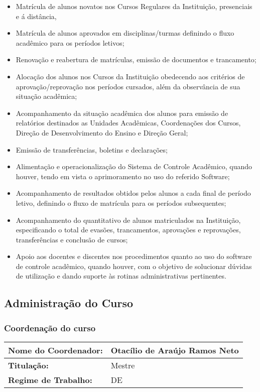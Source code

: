 \begin{itemize}
	\item Matrícula de alunos novatos nos Cursos Regulares da Instituição, presenciais e á distância, 
	\item Matrícula de alunos aprovados em disciplinas/turmas definindo o fluxo acadêmico para os períodos letivos;
	\item Renovação e reabertura de matrículas, emissão de documentos e  trancamento; 
	\item Alocação dos alunos nos Cursos da Instituição obedecendo aos critérios de aprovação/reprovação nos períodos cursados, além da observância de sua situação acadêmica;
	\item Acompanhamento da situação acadêmica dos alunos para emissão de relatórios destinados as Unidades Acadêmicas, Coordenações dos Cursos, Direção de Desenvolvimento do Ensino e Direção Geral;
	\item Emissão de transferências, boletins e declarações;

	\item Alimentação e operacionalização do Sistema de Controle Acadêmico, quando houver, tendo em vista o aprimoramento no uso do referido Software;
	\item Acompanhamento de resultados obtidos pelos alunos a cada final de período letivo, definindo o fluxo de matrícula para os períodos subsequentes; 

	\item Acompanhamento do quantitativo de alunos matriculados na Instituição, especificando o total de evasões, trancamentos, aprovações e reprovações, transferências e conclusão de cursos;
	\item Apoio aos docentes e discentes nos procedimentos quanto ao uso do software de controle acadêmico, quando houver, com o objetivo de solucionar dúvidas de utilização e dando suporte às rotinas administrativas pertinentes.
\end{itemize}


\subsection{Administra\c{c}\~ao do Curso}

\subsubsection{Coordena\c{c}\~ao do curso}

\begin{table}[h]
\begin{tabular}{|l|l|}
\hline
\textbf{Nome do Coordenador:} & Otac\'ilio de Ara\'ujo Ramos Neto \\ \hline
\textbf{Titulação:}           & Mestre                             \\ \hline
\textbf{Regime de Trabalho:}  & DE                                 \\ \hline
\end{tabular}
\end{table}

